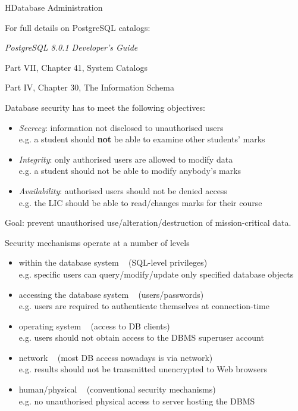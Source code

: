 \begin{lecture}{H}{Database Administration}
\begin{slide}
\end{slide}

\begin{slide}
For full details on PostgreSQL catalogs:

{\em{PostgreSQL 8.0.1 Developer's Guide}}

Part VII, Chapter 41, System Catalogs

Part IV, Chapter 30, The Information Schema
\end{slide}

\begin{slide}
\end{slide}

\begin{slide}
Database security has to meet the following objectives:
\begin{itemize}
\item
{\em{Secrecy}}:
	information not disclosed to unauthorised users \\
	{\small e.g. a student should {\bf{not}} be able to examine other students' marks}
\item
{\em{Integrity}}:
 	only authorised users are allowed to modify data \\
	{\small e.g. a student should not be able to modify anybody's marks}
\item
{\em{Availability}}:
	authorised users should not be denied access \\
	{\small e.g. the LIC should be able to read/changes marks for their course}
\end{itemize}
{\small 
Goal: prevent unauthorised use/alteration/destruction of mission-critical data.
}
\end{slide}

\begin{slide}
Security mechanisms operate at a number of levels
\begin{itemize}
\item within the database system ~ (SQL-level privileges) \\
	{\small e.g. specific users can query/modify/update only specified database objects}
\item accessing the database system ~ (users/passwords) \\
	{\small e.g. users are required to authenticate themselves at connection-time}
\item operating system ~ (access to DB clients) \\
	{\small e.g. users should not obtain access to the DBMS superuser account}
\item network ~ (most DB access nowadays is via network) \\
	{\small e.g. results should not be transmitted unencrypted to Web browsers}
\item human/physical ~ (conventional security mechanisms) \\
	{\small e.g. no unauthorised physical access to server hosting the DBMS}
\end{itemize}
\end{slide}


\end{lecture}
